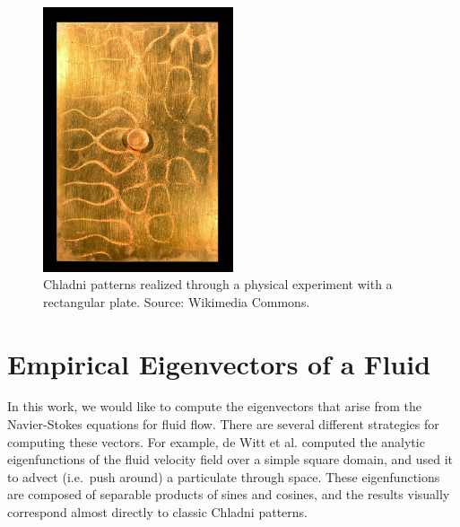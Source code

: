 \documentclass[11pt]{article}
\begin{document}
\begin{figure}
		\centering
		\includegraphics[angle=90,origin=c, width=0.5\textwidth]{Figures/chladni_plate.jpg}
		\vspace*{-2em}
		\caption{Chladni patterns realized through a physical experiment with a rectangular plate. Source: Wikimedia Commons.}
		\label{fig:chladni-plate}
\end{figure}

\section*{Empirical Eigenvectors of a Fluid}

In this work, we would like to compute the eigenvectors that arise from the Navier-Stokes equations for fluid flow. There are several different strategies for computing these vectors. For example, de Witt et al. \cite{deWitt:2012} computed the analytic eigenfunctions of the fluid velocity field over a simple square domain, and used it to advect (i.e.~push around) a particulate through space. These eigenfunctions are composed of separable products of sines and cosines, and the results visually correspond almost directly to classic Chladni patterns. 
\end{document}
